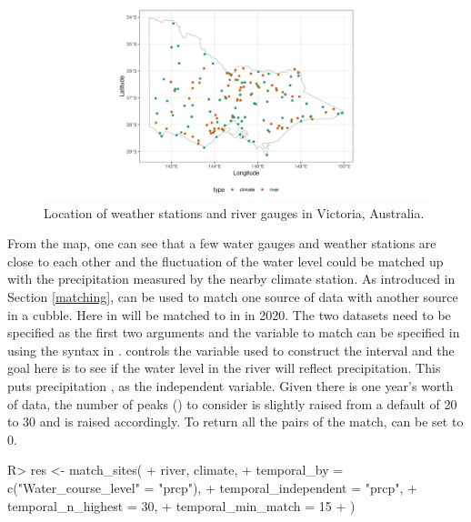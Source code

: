 \documentclass[
]{jss}
\begin{document}
\begin{CodeChunk}
\begin{figure}

{\centering \includegraphics[width=1\linewidth]{../figures/matching-map} 

}

\caption[Location of weather stations and river gauges in Victoria, Australia]{Location of weather stations and river gauges in Victoria, Australia.}\label{fig:matching-map}
\end{figure}
\end{CodeChunk}

From the map, one can see that a few water gauges and weather stations are close to each other and the fluctuation of the water level could be matched up with the precipitation measured by the nearby climate station. As introduced in Section \ref{matching},  can be used to match one source of data with another source in a cubble. Here  in  will be matched to  in  in 2020. The two datasets need to be specified as the first two arguments and the variable to match can be specified in  using the  syntax in .  controls the variable used to construct the interval and the goal here is to see if the water level in the river will reflect precipitation. This puts precipitation , as the independent variable. Given there is one year's worth of data, the number of peaks () to consider is slightly raised from a default of 20 to 30 and  is raised accordingly. To return all the pairs of the match,  can be set to 0.

\begin{CodeChunk}
\begin{CodeInput}
R> res <- match_sites(
+   river, climate,
+   temporal_by = c("Water_course_level" = "prcp"),
+   temporal_independent = "prcp",  
+   temporal_n_highest = 30,
+   temporal_min_match = 15
+ )
\end{CodeInput}
\end{CodeChunk}
\end{document}
